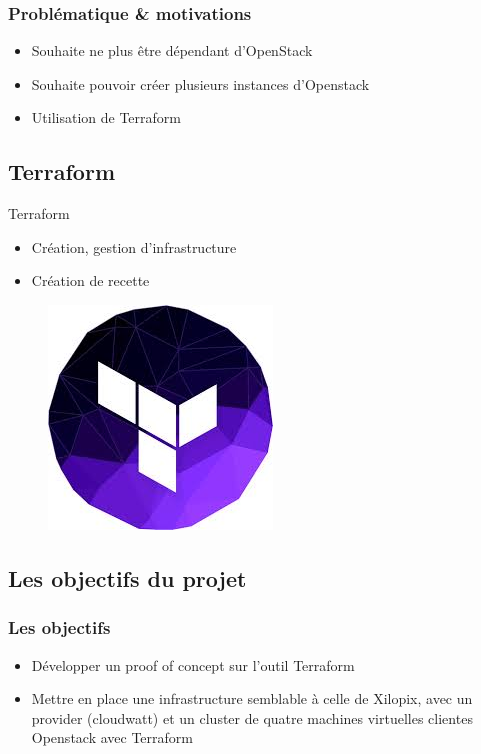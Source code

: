 \documentclass[11pt]{beamer} %
\begin{document}
		
			\begin{frame}
				\frametitle{Problématique \& motivations}
				\begin{itemize}
					\item Souhaite ne plus être dépendant d'OpenStack
					\item Souhaite pouvoir créer plusieurs instances d'Openstack 
					\item Utilisation de Terraform
				\end{itemize}
			\end{frame}
			
		\subsection{Terraform}
			\begin{frame}{Terraform}
			\begin{itemize}
			\item Création, gestion d'infrastructure
			\item Création de recette
			\end{itemize}
			\begin{figure}
				\begin{center}
					\includegraphics[scale=0.3]{logoTerraform.jpg}
				\end{center}
			\end{figure}
			\end{frame}
		
		
		\subsection{Les objectifs du projet}
			\begin{frame}
				\frametitle{Les objectifs}
				\begin{itemize}
					\item Développer un proof of concept sur l'outil Terraform
					\item Mettre en place une infrastructure semblable à celle de Xilopix, avec un provider (cloudwatt) et un cluster de quatre machines virtuelles clientes Openstack avec Terraform
				\end{itemize}
			\end{frame}
		
\end{document}

